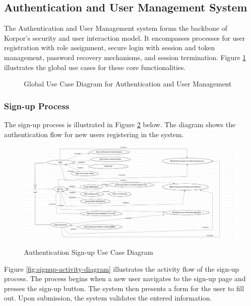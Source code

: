 \subsection{Authentication and User Management System}
The Authentication and User Management system forms the backbone of Korpor's security and user interaction model. It encompasses processes for user registration with role assignment, secure login with session and token management, password recovery mechanisms, and session termination. Figure \ref{fig:auth-usermgmt-usecase} illustrates the global use cases for these core functionalities.

\begin{figure}[htbp]
    \centering
    \caption{Global Use Case Diagram for Authentication and User Management}
    \label{fig:auth-usermgmt-usecase}
\end{figure}
\newpage


\subsubsection{Sign-up Process}
The sign-up process is illustrated in Figure \ref{fig:signup-diagram} below. The diagram shows the authentication flow for new users registering in the system.

\begin{figure}[ht!]
    \centering
    \includegraphics[width=1.03\textwidth]{images/diagram_de_case_d_utilisation_signup.png}
    \caption{Authentication Sign-up Use Case Diagram}
    \label{fig:signup-diagram}
\end{figure}

Figure \ref{fig:signup-activity-diagram} illustrates the activity flow of the sign-up process. The process begins when a new user navigates to the sign-up page and presses the sign-up button. The system then presents a form for the user to fill out. Upon submission, the system validates the entered information. 

